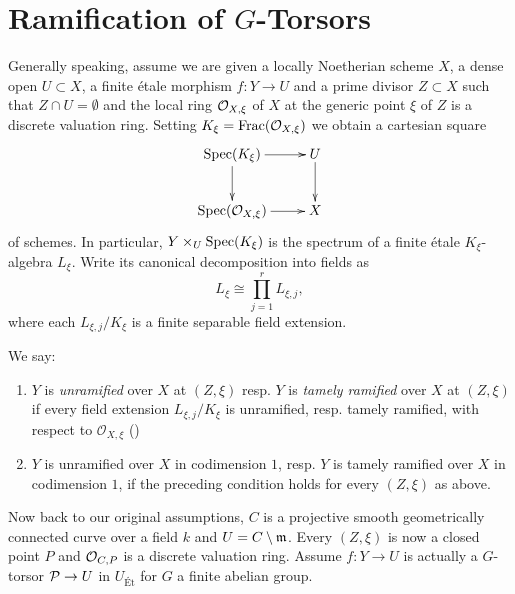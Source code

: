\section{\texorpdfstring{Ramification of $G$-Torsors}{Ramification of G-Torsors}}\label{section:ramification_of_torsors}

Generally speaking, assume we are given a locally Noetherian scheme $X$,
a dense open $U \subset X$, a finite \'etale morphism $f: Y \to U$ and a prime divisor $Z \subset X$ such that $Z \cap U = \emptyset$
and the local ring $\mathcal{O}_{X, \xi}$ of $X$ at the generic point $\xi$ of $Z$ is a discrete valuation ring.
Setting $K_\xi = \operatorname{Frac}(\mathcal{O}_{X, \xi})$ we obtain a cartesian square
\[ \xymatrix{ \mathop{\mathrm{Spec}}(K_\xi ) \ar[r] \ar[d] & U \ar[d] \\ \mathop{\mathrm{Spec}}(\mathcal{O}_{X, \xi }) \ar[r] & X } \]
of schemes.
In particular, $Y \times_U \operatorname{Spec}(K_\xi)$ is the spectrum of a finite \'etale
$K_\xi$-algebra $L_\xi$. Write its canonical decomposition into fields as
\[
    L_\xi \cong \prod_{j=1}^r L_{\xi,j},
\]
where each $L_{\xi,j}/K_\xi$ is a finite separable field extension.
\begin{definition}\label{definition:tamely_ramified_in_codim_1}
We say:
\begin{enumerate}
    \item $Y$ is \textit{unramified} over $X$ at $(Z, \xi)$ resp. $Y$ is \textit{tamely ramified} over $X$ at $(Z, \xi)$
        if every field extension $L_{\xi,j}/K_\xi$ is unramified, resp. tamely ramified, with respect to $\mathcal{O}_{X, \xi}$
        ()

    \item $Y$ is unramified over $X$ in codimension $1$, resp. $Y$ is tamely ramified over $X$ in codimension $1$, if the preceding condition holds for every $(Z, \xi)$ as above.
\end{enumerate}
\end{definition}

Now back to our original assumptions, $C$ is a projective smooth geometrically connected curve
over a field $k$ and $U=C\setminus \mathfrak{m}$. Every $(Z, \xi)$ is now a closed point $P$ and $\mathcal{O}_{C, P}$ is a discrete valuation ring.
Assume $f: Y \to U$ is actually a $G$-torsor $\mathcal{P} \to U$ in $U_{\text{\'Et}}$ for $G$ a finite abelian group.

